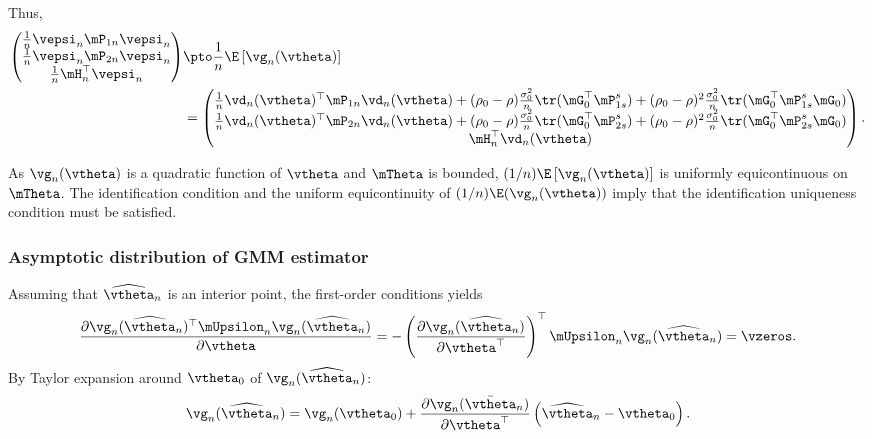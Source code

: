 Thus, 
\begin{equation*}
\begin{aligned}
\begin{pmatrix}
\frac{1}{n}\vepsi_n\mP_{1n}\vepsi_n \\
\frac{1}{n}\vepsi_n\mP_{2n}\vepsi_n \\
\frac{1}{n}\mH_n^\top \vepsi_n \\
\end{pmatrix}
&\pto \frac{1}{n}\E\left[\vg_n(\vtheta)\right] \\
& = \begin{pmatrix}
 \frac{1}{n}\vd_n(\vtheta)^\top\mP_{1n}\vd_n(\vtheta) + (\rho_0 - \rho) \frac{\sigma_0^2}{n}\tr(\mG_0^\top\mP_{1s}^s) + (\rho_0-\rho)^2\frac{\sigma_0^2}{n}\tr(\mG_0^\top\mP_{1s}^s\mG_0) \\
 \frac{1}{n}\vd_n(\vtheta)^\top\mP_{2n}\vd_n(\vtheta) + (\rho_0 - \rho) \frac{\sigma_0^2}{n}\tr(\mG_0^\top\mP_{2s}^s) + (\rho_0-\rho)^2\frac{\sigma_0^2}{n}\tr(\mG_0^\top\mP_{2s}^s\mG_0) \\
 \mH_n^\top\vd_n(\vtheta)
 \end{pmatrix}.
 \end{aligned}
\end{equation*}

As $\vg_n(\vtheta)$ is a quadratic function of $\vtheta$ and $\mTheta$ is bounded, $(1/n)\E\left[\vg_n(\vtheta)\right]$ is uniformly equicontinuous on $\mTheta$. The identification condition and the uniform equicontinuity of $(1/n)\E(\vg_n(\vtheta))$ imply that the identification uniqueness condition must be satisfied.
\subsubsection{Asymptotic distribution of GMM estimator}
  Assuming that $\widehat{\vtheta}_n$ is an interior point, the first-order conditions yields
  \begin{equation}\label{eq:proof-gmm-2sls-foc}
    \frac{\partial \vg_n(\widehat{\vtheta}_n)^\top\mUpsilon_n\vg_n(\widehat{\vtheta}_n)}{\partial \vtheta} = - \left(\frac{\partial \vg_n(\widehat{\vtheta}_n)}{\partial \vtheta^\top}\right)^\top \mUpsilon_n \vg_n(\widehat{\vtheta}_n) = \vzeros.
  \end{equation}
  By Taylor expansion around $\vtheta_0$ of $\vg_n(\widehat{\vtheta}_n)$:
  \begin{equation}\label{eq:proof-gmm-2sls-taylor}
  \vg_n(\widehat{\vtheta}_n) = \vg_n(\vtheta_0) + \frac{\partial \vg_n(\bar{\vtheta}_n)}{\partial \vtheta^\top}\left(\widehat{\vtheta}_n - \vtheta_0\right).
  \end{equation}

